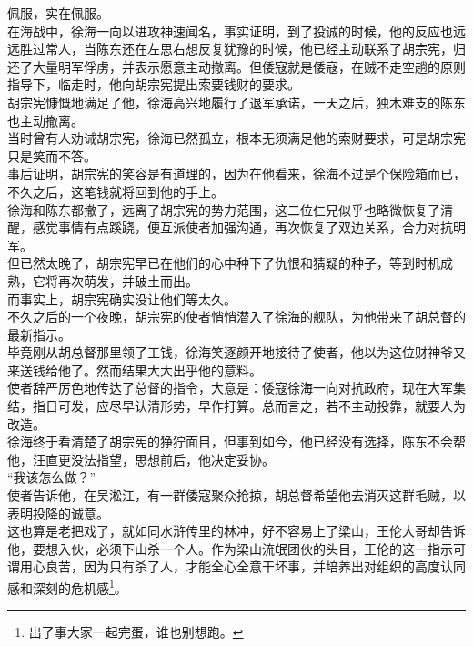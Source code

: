 \begin{multicols}{\theparacolNo}
佩服，实在佩服。\\

在海战中，徐海一向以进攻神速闻名，事实证明，到了投诚的时候，他的反应也远远胜过常人，当陈东还在左思右想反复犹豫的时候，他已经主动联系了胡宗宪，归还了大量明军俘虏，并表示愿意主动撤离。但倭寇就是倭寇，在贼不走空趟的原则指导下，临走时，他向胡宗宪提出索要钱财的要求。\\

胡宗宪慷慨地满足了他，徐海高兴地履行了退军承诺，一天之后，独木难支的陈东也主动撤离。\\

当时曾有人劝诫胡宗宪，徐海已然孤立，根本无须满足他的索财要求，可是胡宗宪只是笑而不答。\\

事后证明，胡宗宪的笑容是有道理的，因为在他看来，徐海不过是个保险箱而已，不久之后，这笔钱就将回到他的手上。\\

徐海和陈东都撤了，远离了胡宗宪的势力范围，这二位仁兄似乎也略微恢复了清醒，感觉事情有点蹊跷，便互派使者加强沟通，再次恢复了双边关系，合力对抗明军。\\

但已然太晚了，胡宗宪早已在他们的心中种下了仇恨和猜疑的种子，等到时机成熟，它将再次萌发，并破土而出。\\

而事实上，胡宗宪确实没让他们等太久。\\

不久之后的一个夜晚，胡宗宪的使者悄悄潜入了徐海的舰队，为他带来了胡总督的最新指示。\\

毕竟刚从胡总督那里领了工钱，徐海笑逐颜开地接待了使者，他以为这位财神爷又来送钱给他了。然而结果大大出乎他的意料。\\

使者辞严厉色地传达了总督的指令，大意是：倭寇徐海一向对抗政府，现在大军集结，指日可发，应尽早认清形势，早作打算。总而言之，若不主动投靠，就要人为改造。\\

徐海终于看清楚了胡宗宪的狰狞面目，但事到如今，他已经没有选择，陈东不会帮他，汪直更没法指望，思想前后，他决定妥协。\\

“我该怎么做？”\\

使者告诉他，在吴淞江，有一群倭寇聚众抢掠，胡总督希望他去消灭这群毛贼，以表明投降的诚意。\\

这也算是老把戏了，就如同水浒传里的林冲，好不容易上了梁山，王伦大哥却告诉他，要想入伙，必须下山杀一个人。作为梁山流氓团伙的头目，王伦的这一指示可谓用心良苦，因为只有杀了人，才能全心全意干坏事，并培养出对组织的高度认同感和深刻的危机感\footnote{出了事大家一起完蛋，谁也别想跑。}。\\


\end{multicols}
